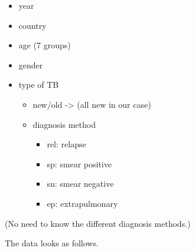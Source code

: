 \documentclass[]{tufte-book}
\newenvironment{Shaded}{}{}
\newcommand{\KeywordTok}[1]{\textcolor[rgb]{0.00,0.44,0.13}{\textbf{#1}}}
\newcommand{\NormalTok}[1]{#1}
\newcommand{\OperatorTok}[1]{\textcolor[rgb]{0.40,0.40,0.40}{#1}}
\newcommand{\StringTok}[1]{\textcolor[rgb]{0.25,0.44,0.63}{#1}}
\providecommand{\tightlist}{%
  \setlength{\itemsep}{0pt}\setlength{\parskip}{0pt}}
\begin{document}
\begin{itemize}
\tightlist
\item
  year
\item
  country
\item
  age (7 groups)
\item
  gender
\item
  type of TB

  \begin{itemize}
  \tightlist
  \item
    new/old -\textgreater{} (all new in our case)
  \item
    diagnosis method

    \begin{itemize}
    \tightlist
    \item
      rel: relapse
    \item
      sp: smear positive
    \item
      sn: smear negative
    \item
      ep: extrapulmonary
    \end{itemize}
  \end{itemize}
\end{itemize}

(No need to know the different diagnosis methods.)

The data looks as follows.

\begin{Shaded}
\end{Shaded}
\end{document}
